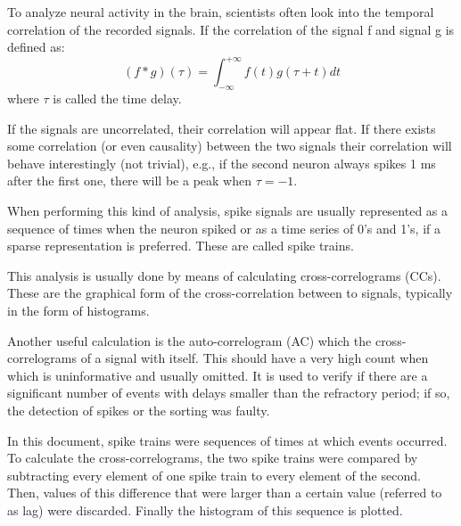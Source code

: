 To analyze neural activity in the brain, scientists often look into the temporal correlation of the recorded signals. If the correlation of the signal f and signal g is defined as:
\begin{equation}
\left( f * g \right) \left( \tau \right) = \int_{- \infty }^{ + \infty } f \left( t \right) g \left( \tau + t \right) dt
\label{eq:CCdefinition}
\end{equation}
where $\tau$ is called the time delay.

If the signals are uncorrelated, their correlation will appear flat. If there exists some correlation (or even causality) between the two signals their correlation will behave interestingly (not trivial), e.g., if the second neuron always spikes 1 ms after the first one, there will be a peak when $\tau = -1$.

When performing this kind of analysis, spike signals are usually represented as a sequence of times when the neuron spiked or as a time series of 0's and 1's, if a sparse representation is preferred. These are called spike trains.

This analysis is usually done by means of calculating cross-correlograms (CCs). These are the graphical form of the cross-correlation between to signals, typically in the form of histograms.

Another useful calculation is the auto-correlogram (AC) which the cross-correlograms of a signal with itself. This should have a very high count when  which is uninformative and usually omitted. It is used to verify if there are a significant number of events with delays smaller than the refractory period; if so, the detection of spikes or the sorting was faulty.

In this document, spike trains were sequences of times at which events occurred. To calculate the cross-correlograms, the two spike trains were compared by subtracting every element of one spike train to every element of the second. Then, values of this difference that were larger than a certain value (referred to as lag) were discarded. Finally the histogram of this sequence is plotted.

